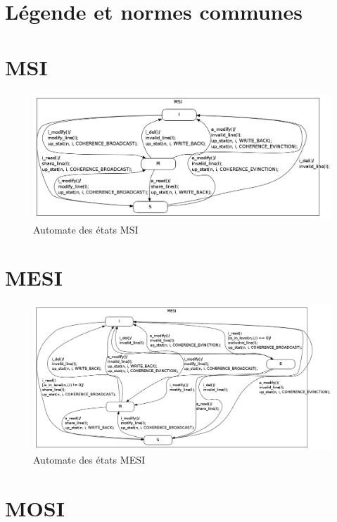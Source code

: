 \section{Légende et normes communes}

\section{MSI}

\begin{figure}[!h]
\begin{center}
   \includegraphics[scale=0.3]{images/MSI.png}
   \caption{\label{img:state_msi} Automate des états MSI}
\end{center}
\end{figure}

\section{MESI}

\begin{figure}[!h]
\begin{center}
   \includegraphics[scale=0.3]{images/MESI.png}
   \caption{\label{img:state_mesi} Automate des états MESI}
\end{center}
\end{figure}

\section{MOSI}


